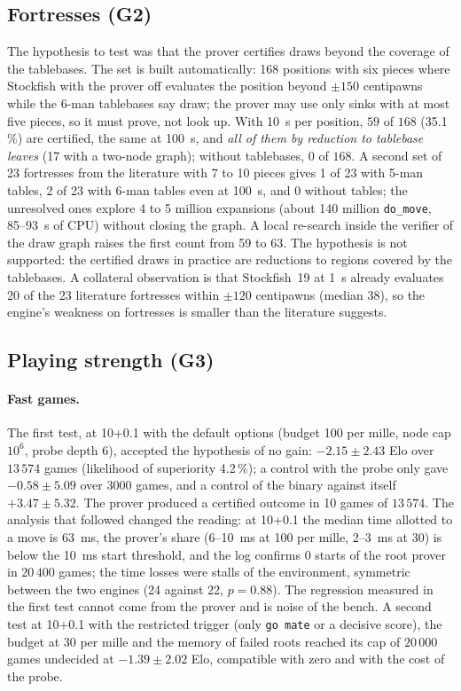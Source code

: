 \documentclass{article}
\theoremstyle{plain}
\theoremstyle{definition}
\theoremstyle{remark}
\newcommand{\code}[1]{\texttt{#1}}
\begin{document}
\subsection{Fortresses (G2)}\label{sec:g2}

The hypothesis to test was that the prover certifies draws beyond the coverage of the tablebases. The set is built automatically: 168 positions with six pieces where Stockfish with the prover off evaluates the position beyond $\pm 150$ centipawns while the 6-man tablebases say draw; the prover may use only sinks with at most five pieces, so it must prove, not look up. With 10~s per position, $59$ of $168$ (35.1\,\%) are certified, the same at 100~s, and \emph{all of them by reduction to tablebase leaves} (17 with a two-node graph); without tablebases, $0$ of $168$. A second set of 23 fortresses from the literature with 7 to 10 pieces gives 1 of 23 with 5-man tables, 2 of 23 with 6-man tables even at 100~s, and 0 without tables; the unresolved ones explore 4 to 5 million expansions (about 140 million \code{do\_move}, 85--93~s of CPU) without closing the graph. A local re-search inside the verifier of the draw graph raises the first count from 59 to 63. The hypothesis is not supported: the certified draws in practice are reductions to regions covered by the tablebases. A collateral observation is that Stockfish~19 at 1~s already evaluates 20 of the 23 literature fortresses within $\pm 120$ centipawns (median 38), so the engine's weakness on fortresses is smaller than the literature suggests.

\subsection{Playing strength (G3)}\label{sec:g3}

\paragraph{Fast games.} The first test, at 10+0.1 with the default options (budget 100 per mille, node cap $10^6$, probe depth 6), accepted the hypothesis of no gain: $-2.15 \pm 2.43$ Elo over $13\,574$ games (likelihood of superiority 4.2\,\%); a control with the probe only gave $-0.58 \pm 5.09$ over 3000 games, and a control of the binary against itself $+3.47 \pm 5.32$. The prover produced a certified outcome in 10 games of $13\,574$. The analysis that followed changed the reading: at 10+0.1 the median time allotted to a move is 63~ms, the prover's share (6--10~ms at 100 per mille, 2--3~ms at 30) is below the 10~ms start threshold, and the log confirms $0$ starts of the root prover in $20\,400$ games; the time losses were stalls of the environment, symmetric between the two engines (24 against 22, $p = 0.88$). The regression measured in the first test cannot come from the prover and is noise of the bench. A second test at 10+0.1 with the restricted trigger (only \code{go mate} or a decisive score), the budget at 30 per mille and the memory of failed roots reached its cap of $20\,000$ games undecided at $-1.39 \pm 2.02$ Elo, compatible with zero and with the cost of the probe.
\end{document}
